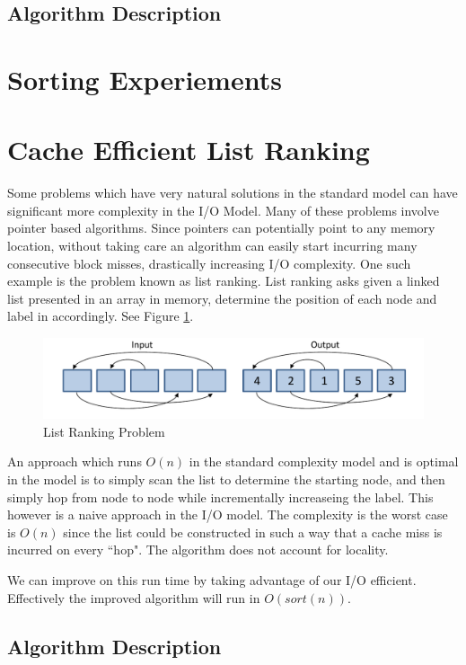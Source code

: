 \documentclass[11pt]{article}
\begin{document}
\subsection{Algorithm Description}

\section{Sorting Experiements}

\section{Cache Efficient List Ranking}
Some problems which have very natural solutions in the standard model can have significant more complexity in the I/O Model. 
Many of these problems involve pointer based algorithms.  Since pointers can potentially point to any memory location, without 
taking care an algorithm can easily start incurring many consecutive block misses, drastically increasing I/O complexity.  One 
such example is the problem known as list ranking.  List ranking asks given a linked list presented in an array in memory, determine 
the position of each node and label in accordingly.  See Figure  \ref{listrankingio}.

\begin{figure}[H]  
\includegraphics[scale=0.5]{figures/listrankingio.pdf}
\caption{List Ranking Problem}
\label{listrankingio}
\end{figure}

An approach which runs $O(n)$ in the standard complexity model and is optimal in the model is to simply scan the list to determine the 
starting node, and then simply hop from node to node while incrementally increaseing the label.  This however is a naive approach in 
the I/O model.  The complexity is the worst case is $O(n)$ since the list could be constructed in such a way that a cache miss is incurred on 
every ``hop".  The algorithm does not account for locality.  

We can improve on this run time by taking advantage of our I/O efficient.  Effectively the improved algorithm will run in $O(sort(n))$. 

\subsection{Algorithm Description}
\end{document}
